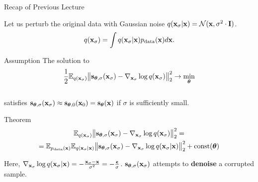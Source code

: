 \documentclass{beamer}
\begin{document}
\begin{frame}{Recap of Previous Lecture}

    Let us perturb the original data with Gaussian noise $q(\mathbf{x}_{\sigma} | \mathbf{x}) = \mathcal{N}(\mathbf{x}, \sigma^2 \cdot \mathbf{I})$.
    \vspace{-0.3cm}
    \[
        q(\mathbf{x}_{\sigma}) = \int q(\mathbf{x}_{\sigma} | \mathbf{x}) p_{\text{data}}(\mathbf{x}) d\mathbf{x}.
    \]
    \vspace{-0.6cm}
    \begin{block}{Assumption}
        The solution to
        \vspace{-0.3cm}
        \[
            \frac{1}{2} \mathbb{E}_{q(\mathbf{x}_{\sigma})}\big\| \mathbf{s}_{\boldsymbol{\theta}, \sigma}(\mathbf{x}_{\sigma}) - \nabla_{\mathbf{x}_{\sigma}} \log q(\mathbf{x}_{\sigma}) \big\|^2_2 \rightarrow \min_{\boldsymbol{\theta}}
        \]
        \vspace{-0.3cm} \\
        satisfies $\mathbf{s}_{\boldsymbol{\theta}, \sigma}(\mathbf{x}_{\sigma}) \approx \mathbf{s}_{\boldsymbol{\theta}, 0}(\mathbf{x}_0) = \mathbf{s}_{\boldsymbol{\theta}}(\mathbf{x})$ if $\sigma$ is sufficiently small.
    \end{block}
    \begin{block}{Theorem}
        \vspace{-0.8cm}
        \begin{multline*}
            \mathbb{E}_{q(\mathbf{x}_{\sigma})}\bigl\| \mathbf{s}_{\boldsymbol{\theta}, \sigma}(\mathbf{x}_{\sigma}) - \nabla_{\mathbf{x}_{\sigma}} \log q(\mathbf{x}_{\sigma}) \bigr\|^2_2 = \\ = \mathbb{E}_{p_{\text{data}}(\mathbf{x})} \mathbb{E}_{q(\mathbf{x}_{\sigma} | \mathbf{x})}\bigl\| \mathbf{s}_{\boldsymbol{\theta}, \sigma}(\mathbf{x}_{\sigma}) - \nabla_{\mathbf{x}_{\sigma}} \log q(\mathbf{x}_{\sigma} | \mathbf{x}) \bigr\|^2_2 + \text{const}(\boldsymbol{\theta})
        \end{multline*}
        \vspace{-0.7cm}
    \end{block}
    Here, $\nabla_{\mathbf{x}_{\sigma}} \log q(\mathbf{x}_{\sigma} | \mathbf{x}) = - \frac{\mathbf{x}_{\sigma} - \mathbf{x}}{\sigma^2} = - \frac{\boldsymbol{\epsilon}}{\sigma}$. $\mathbf{s}_{\boldsymbol{\theta}, \sigma}(\mathbf{x}_{\sigma})$ attempts to \textbf{denoise} a corrupted sample.
\end{frame}
\end{document}
